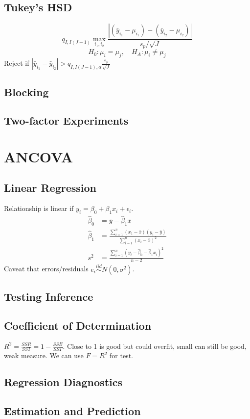 \documentclass{article}
\begin{document}
\begin{multicols}{3}
\subsection{Tukey's HSD}
\[
    q_{I,I(J-1)}\max_{i_1,i_2}\frac{|(\bar{y}_{i_1}-\mu_{i_1})-(\bar{y}_{i_2}-\mu_{i_2})|}{s_p/\sqrt{J}}
\]
\[
    H_0: \mu_i = \mu_j, \quad H_A: \mu_i \ne \mu_j
\]
Reject if \(|\bar{y}_{i_1}-\bar{y}_{i_2}|>q_{I,I(J-1),\alpha}\frac{s_p}{\sqrt{J}}\)
\subsection{Blocking}
\subsection{Two-factor Experiments}
\section{ANCOVA}
\subsection{Linear Regression}
Relationship is linear if \(y_i = \beta_0+\beta_1x_i+\epsilon_i\).
\begin{align*}
    \hat{\beta}_0 & = \bar{y}-\hat{\beta}_1\bar{x}\\
    \hat{\beta}_1 & =
    \frac{\sum_{i=1}^n(x_1-\bar{x})(y_i-\bar{y})}{\sum_{i=1}^n(x_i-\bar{x})^2}\\
    s^2 & =
    \frac{\sum_{i=1}^n(y_i-\hat{\beta}_0-\hat{\beta}_1x_i)^2}{n-2}
\end{align*}
Caveat that errors/residuals \(e_i\stackrel{iid}{\sim}N(0,\sigma^2)\).
\subsection{Testing Inference}
\subsection{Coefficient of Determination}
\(R^2 = \frac{SSR}{SST} = 1-\frac{SSE}{SST}\).
Close to 1 is good but could overfit, small can still be good, weak measure.
We can use \(F=R^2\) for test.
\subsection{Regression Diagnostics}
\subsection{Estimation and Prediction}

\end{multicols}
\end{document}

